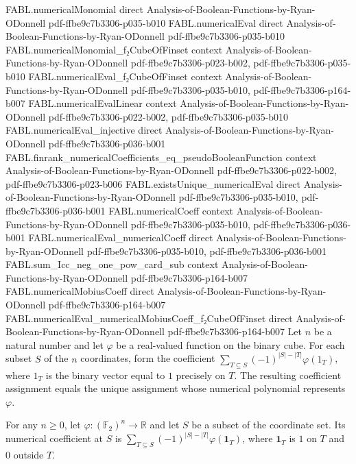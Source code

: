 \begin{theorem}
  {FABL.numericalMonomial}
  {direct}
  {Analysis-of-Boolean-Functions-by-Ryan-ODonnell}
  {pdf-ffbe9c7b3306-p035-b010}
\proofstep
  {FABL.numericalEval}
  {direct}
  {Analysis-of-Boolean-Functions-by-Ryan-ODonnell}
  {pdf-ffbe9c7b3306-p035-b010}
\proofstep
  {FABL.numericalMonomial_f₂CubeOfFinset}
  {context}
  {Analysis-of-Boolean-Functions-by-Ryan-ODonnell}
  {pdf-ffbe9c7b3306-p023-b002,
    pdf-ffbe9c7b3306-p035-b010}
\proofstep
  {FABL.numericalEval_f₂CubeOfFinset}
  {context}
  {Analysis-of-Boolean-Functions-by-Ryan-ODonnell}
  {pdf-ffbe9c7b3306-p035-b010,
    pdf-ffbe9c7b3306-p164-b007}
\proofstep
  {FABL.numericalEvalLinear}
  {context}
  {Analysis-of-Boolean-Functions-by-Ryan-ODonnell}
  {pdf-ffbe9c7b3306-p022-b002,
    pdf-ffbe9c7b3306-p035-b010}
\proofstep
  {FABL.numericalEval_injective}
  {direct}
  {Analysis-of-Boolean-Functions-by-Ryan-ODonnell}
  {pdf-ffbe9c7b3306-p036-b001}
\proofstep
  {FABL.finrank_numericalCoefficients_eq_pseudoBooleanFunction}
  {context}
  {Analysis-of-Boolean-Functions-by-Ryan-ODonnell}
  {pdf-ffbe9c7b3306-p022-b002,
    pdf-ffbe9c7b3306-p023-b006}
\proofstep
  {FABL.existsUnique_numericalEval}
  {direct}
  {Analysis-of-Boolean-Functions-by-Ryan-ODonnell}
  {pdf-ffbe9c7b3306-p035-b010,
    pdf-ffbe9c7b3306-p036-b001}
\proofstep
  {FABL.numericalCoeff}
  {context}
  {Analysis-of-Boolean-Functions-by-Ryan-ODonnell}
  {pdf-ffbe9c7b3306-p035-b010,
    pdf-ffbe9c7b3306-p036-b001}
\proofstep
  {FABL.numericalEval_numericalCoeff}
  {direct}
  {Analysis-of-Boolean-Functions-by-Ryan-ODonnell}
  {pdf-ffbe9c7b3306-p035-b010,
    pdf-ffbe9c7b3306-p036-b001}
\proofstep
  {FABL.sum_Icc_neg_one_pow_card_sub}
  {context}
  {Analysis-of-Boolean-Functions-by-Ryan-ODonnell}
  {pdf-ffbe9c7b3306-p164-b007}
\proofstep
  {FABL.numericalMobiusCoeff}
  {direct}
  {Analysis-of-Boolean-Functions-by-Ryan-ODonnell}
  {pdf-ffbe9c7b3306-p164-b007}
\proofstep
  {FABL.numericalEval_numericalMobiusCoeff_f₂CubeOfFinset}
  {direct}
  {Analysis-of-Boolean-Functions-by-Ryan-ODonnell}
  {pdf-ffbe9c7b3306-p164-b007}
Let $n$ be a natural number and let $\varphi$ be a real-valued function on the binary
cube. For each subset $S$ of the $n$ coordinates, form the coefficient
$\sum_{T\subseteq S}(-1)^{|S|-|T|}\varphi(1_T)$, where $1_T$ is the binary vector
equal to $1$ precisely on $T$. The resulting coefficient assignment equals the unique
assignment whose numerical polynomial represents $\varphi$.
\end{theorem}

\begin{theorem}
\label{FABL.numericalCoeff_eq_mobius_sum}
\leanok
{}
For any $n\ge 0$, let $\varphi:(\mathbb{F}_2)^n\to\mathbb{R}$ and let $S$ be a subset of
the coordinate set. Its numerical coefficient at $S$ is $\displaystyle \sum_{T\subseteq
S}(-1)^{|S|-|T|}\varphi(\mathbf{1}_T)$, where $\mathbf{1}_T$ is $1$ on $T$ and $0$
outside $T$.
\end{theorem}
